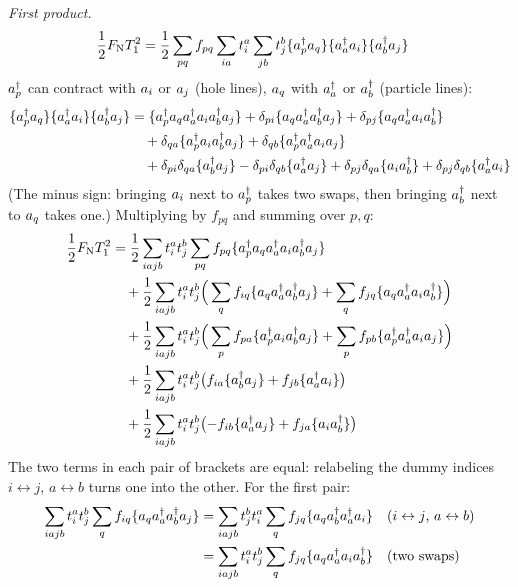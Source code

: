\emph{First product.}
\begin{align*}
\frac{1}{2} F_{\mathrm{N}} T_1^2 &= \frac{1}{2} \sum_{pq} f_{pq} \sum_{ia} t_i^a \sum_{jb} t_j^b \{a^{\dagger}_{p} a_{q}\} \{a^{\dagger}_{a} a_{i}\} \{a^{\dagger}_{b} a_{j}\}
\end{align*}
$a^{\dagger}_{p}$ can contract with $a_{i}$ or $a_{j}$ (hole lines), $a_{q}$ with $a^{\dagger}_{a}$ or $a^{\dagger}_{b}$ (particle lines):
\begin{align*}
\{a^{\dagger}_{p} a_{q}\} \{a^{\dagger}_{a} a_{i}\} \{a^{\dagger}_{b} a_{j}\} &= \{a^{\dagger}_{p} a_{q} a^{\dagger}_{a} a_{i} a^{\dagger}_{b} a_{j}\} + \delta_{pi} \{a_{q} a^{\dagger}_{a} a^{\dagger}_{b} a_{j}\} + \delta_{pj} \{a_{q} a^{\dagger}_{a} a_{i} a^{\dagger}_{b}\} \\
&\quad + \delta_{qa} \{a^{\dagger}_{p} a_{i} a^{\dagger}_{b} a_{j}\} + \delta_{qb} \{a^{\dagger}_{p} a^{\dagger}_{a} a_{i} a_{j}\} \\
&\quad + \delta_{pi} \delta_{qa} \{a^{\dagger}_{b} a_{j}\} - \delta_{pi} \delta_{qb} \{a^{\dagger}_{a} a_{j}\} + \delta_{pj} \delta_{qa} \{a_{i} a^{\dagger}_{b}\} + \delta_{pj} \delta_{qb} \{a^{\dagger}_{a} a_{i}\}
\end{align*}
(The minus sign: bringing $a_{i}$ next to $a^{\dagger}_{p}$ takes two swaps, then bringing $a^{\dagger}_{b}$ next to $a_{q}$ takes one.) Multiplying by $f_{pq}$ and summing over $p, q$:
\begin{align*}
\frac{1}{2} F_{\mathrm{N}} T_1^2 &= \frac{1}{2} \sum_{iajb} t_i^a t_j^b \sum_{pq} f_{pq} \{a^{\dagger}_{p} a_{q} a^{\dagger}_{a} a_{i} a^{\dagger}_{b} a_{j}\} \\
&\quad + \frac{1}{2} \sum_{iajb} t_i^a t_j^b \Big(\sum_q f_{iq} \{a_{q} a^{\dagger}_{a} a^{\dagger}_{b} a_{j}\} + \sum_q f_{jq} \{a_{q} a^{\dagger}_{a} a_{i} a^{\dagger}_{b}\}\Big) \\
&\quad + \frac{1}{2} \sum_{iajb} t_i^a t_j^b \Big(\sum_p f_{pa} \{a^{\dagger}_{p} a_{i} a^{\dagger}_{b} a_{j}\} + \sum_p f_{pb} \{a^{\dagger}_{p} a^{\dagger}_{a} a_{i} a_{j}\}\Big) \\
&\quad + \frac{1}{2} \sum_{iajb} t_i^a t_j^b \big(f_{ia} \{a^{\dagger}_{b} a_{j}\} + f_{jb} \{a^{\dagger}_{a} a_{i}\}\big) \\
&\quad + \frac{1}{2} \sum_{iajb} t_i^a t_j^b \big({-f_{ib}} \{a^{\dagger}_{a} a_{j}\} + f_{ja} \{a_{i} a^{\dagger}_{b}\}\big)
\end{align*}
The two terms in each pair of brackets are equal: relabeling the dummy indices $i \leftrightarrow j$, $a \leftrightarrow b$ turns one into the other. For the first pair:
\begin{align*}
\sum_{iajb} t_i^a t_j^b \sum_q f_{iq} \{a_{q} a^{\dagger}_{a} a^{\dagger}_{b} a_{j}\} &= \sum_{iajb} t_j^b t_i^a \sum_q f_{jq} \{a_{q} a^{\dagger}_{b} a^{\dagger}_{a} a_{i}\} \quad\text{($i \leftrightarrow j$, $a \leftrightarrow b$)} \\
&= \sum_{iajb} t_i^a t_j^b \sum_q f_{jq} \{a_{q} a^{\dagger}_{a} a_{i} a^{\dagger}_{b}\} \quad\text{(two swaps)}
\end{align*}
